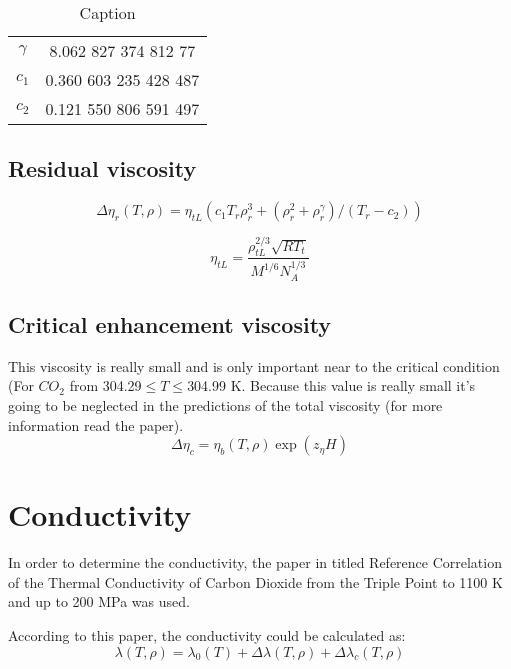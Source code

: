 \begin{table}[ht]
    \centering
    \begin{tabular}{c c}
    \hline
    \hline
    $\gamma$   & 8.062 827 374 812 77    \\  
    $c_1$ & 0.360 603 235 428 487    \\       
    $c_2$   & 0.121 550 806 591 497   \\
    \hline
    \end{tabular}
    \caption{Caption}
    \label{tab:my_label3}
\end{table}


\subsection{Residual viscosity}

\begin{equation}
    \Delta\eta_r(T,\rho) = \eta_{tL}(c_1T_r\rho_r^3 + (\rho_r^2 + \rho_r^\gamma)/(T_r -c_2))
\end{equation}

\begin{equation}
    \eta_{tL} = \frac{\rho_{tL}^{2/3} \sqrt{RT_t}}{M^{1/6}N_A^{1/3}}
\end{equation}

\subsection{Critical enhancement viscosity}
This viscosity is really small and is only important near to the critical condition (For $CO_2$ from 304.29$\leq T\leq$304.99 K. Because this value is really small it's going to be neglected in the predictions of the total viscosity (for more information read the paper). 
\begin{equation}
    \Delta\eta_c = \eta_b(T,\rho)\exp{\left(z_\eta H\right)}
\end{equation}

\section{Conductivity}
In order to determine the conductivity, the paper in titled Reference Correlation of the Thermal Conductivity of Carbon Dioxide from the Triple Point to 1100 K and up to 200 MPa was used.

According to this paper, the conductivity could be calculated as:
\begin{equation}
    \lambda(T,\rho) = \lambda_0(T) + \Delta\lambda(T,\rho) + \Delta\lambda_c(T,\rho)    
\end{equation}

